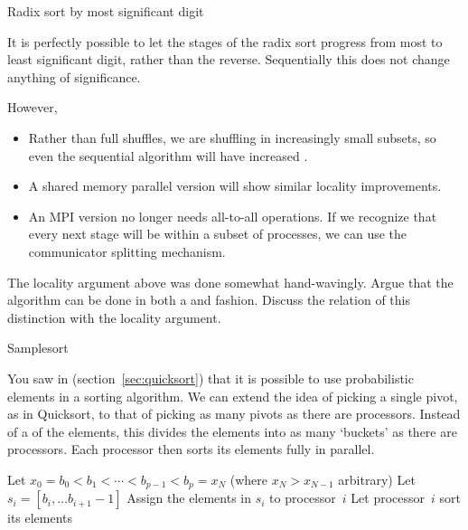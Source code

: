  {Radix sort by most significant digit}

It is perfectly possible to let the stages of the radix sort progress
from most to least significant digit, rather than the
reverse. Sequentially this does not change anything of significance.

However,
\begin{itemize}
\item Rather than full shuffles, we are shuffling in increasingly
  small subsets, so even the sequential algorithm will have increased
  .
\item A shared memory parallel version will show similar locality
  improvements.
\item An MPI version no longer needs all-to-all operations. If we
  recognize that every next stage will be within a subset of
  processes, we can use the communicator splitting mechanism.
\end{itemize}

\begin{exercise}
  The locality argument above was done somewhat hand-wavingly. Argue
  that the algorithm can be done in both a 
  and  fashion. Discuss the relation of this
  distinction with the locality argument.
\end{exercise}



 {Samplesort}
\label{sec:samplesort}

You saw in  (section~\ref{sec:quicksort}) that
it is possible to use probabilistic elements in a sorting
algorithm. We can extend the idea of picking a single pivot, as in
Quicksort, to that of picking as many pivots as there are processors.
Instead of a  of the elements, this divides the
elements into as many `buckets' as there are processors. Each
processor then sorts its elements fully in parallel.

\begin{displayalgorithm}
  Let $x_0=b_0<b_1<\cdots<b_{p-1}<b_p=x_N$ (where $x_N>x_{N-1}$ arbitrary)\;
   { Let $s_i=[b_i,\ldots b_{i+1}-1]$ }
   { Assign the elements in $s_i$ to
    processor~$i$ }
   { Let processor~$i$ sort its
    elements }
  \caption{The Samplesort algorithm}
\end{displayalgorithm}

